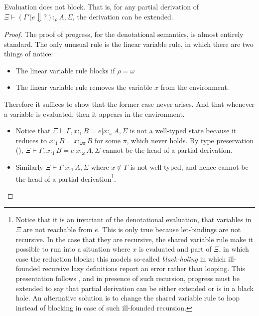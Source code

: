 \documentclass[acmsmall,screen]{acmart}\settopmatter{}
\begin{document}
{{
\renewcommand{\thetheorem}{\ref{thm:progress-denotational}}
\begin{theorem}[Progress]
  Evaluation does not block. That is, for any partial derivation of
  $Ξ ⊢ (Γ'|e ⇓ ?) :_ρ A,Σ$, the derivation can be
  extended.
\end{theorem}
\addtocounter{theorem}{-1}
}
\begin{proof}
  The proof of progress, for the denotational semantics, is almost
  entirely standard. The only unusual rule is the linear variable
  rule, in which there are two things of notice:
  \begin{itemize}
  \item The linear variable rule blocks if $ρ = ω$
  \item The linear variable rule removes the variable $x$ from the
    environment.
  \end{itemize}
  Therefore it suffices to show that the former case never arises. And
  that whenever a variable is evaluated, then it appears in the
  environment.
  \begin{itemize}
  \item Notice that $Ξ⊢Γ,x:_1 B = e|x :_ω A,Σ$ is not a well-typed
    state because it reduces to $x:_1B = x:_{ωπ} B$ for some $π$,
    which never holds. By type preservation (),
    $Ξ⊢Γ,x:_1 B = e|x :_ω A,Σ$ cannot be the head of a partial
    derivation.
  \item Similarly $Ξ⊢Γ|x :_1 A,Σ$ where $x∉Γ$ is not well-typed, and
    hence cannot be the head of a partial derivation\footnote{Notice
      that it is an invariant of the denotational evaluation, that
      variables in $Ξ$ are not reachable from $e$. This is only true
      because let-bindings are not recursive. In the case that they
      are recursive, the shared variable rule make it possible to run
      into a situation where $x$ is evaluated and part of $Ξ$, in
      which case the reduction blocks: this models so-called
      \emph{black-holing} in which ill-founded recursive lazy
      definitions report an error rather than looping. This
      presentation follows \citet{launchbury_natural_1993}, and in
      presence of such recursion, progress must be extended to say
      that partial derivation can be either extended or is in a black
      hole. An alternative solution is to change the shared variable
      rule to loop instead of blocking in case of such ill-founded
      recursion.}.
  \end{itemize}
\end{proof}

}
\end{document}
